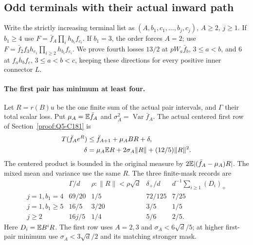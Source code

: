 \subsection{Odd terminals with their actual inward path}
\label{sec:odd-complete:inward-anchor}

Write the strictly increasing terminal list as
$(A,b_1,c_1,\ldots,b_j,c_j)$, $A\ge2$, $j\ge1$.
If $b_1\ge4$ use
$F=\bar f_A\prod_i h_{b_i}f_{c_i}$.
If $b_1=3$, the order forces $A=2$; use
$F=\bar f_2f_3h_{c_1}\prod_{i\ge2}h_{b_i}f_{c_i}$.
We prove fourth losses $13/2$ at $pW_a\bar f_b$, $3\le a<b$,
and $6$ at $f_a h_bf_c$, $3\le a<b<c$, keeping these directions
for every positive inner connector $L$.

\paragraph{The first pair has minimum at least four.}
Let $R=r(B)u$ be the one finite sum of the actual pair intervals,
and $\Gamma$ their total scalar loss. Put
$\mu_A=\mathbb E\bar f_A$ and
$\sigma_A^2=\operatorname{Var}\bar f_A$.
The actual centered first row of Section~\ref{proof:Q5-C181} is
\begin{equation}\label{eq:odd-anchor:general-first}
\begin{aligned}
 T(\bar f_Ae^R)&\le\bar f_{A+1}+\mu_A BR+\delta,\\
 \delta&=\mu_A\mathbb E R+2\sigma_A\|R\|+(12/5)\|R\|^2.
\end{aligned}
\end{equation}
The centered product is bounded in the original measure by
$2\mathbb E| (\bar f_A-\mu_A)R|$. The mixed mean and variance use
the same $R$. The three finite-mask records are
\[
\begin{array}{c|c|c|c|c}
 &\Gamma/d&\rho:\|R\|<\rho\sqrt d&\delta_+/d
                   &d^{-1}\sum_{i\ge1}(D_i)_+\\\hline
 j=1,b_1=4&69/20&1/5&72/125&7/25\\
 j=1,b_1\ge5&16/5&3/20&3/5&1/5\\
 j\ge2&16j/5&1/4&5/6&2/5.
\end{array}
\]
Here $D_i=\mathbb E B^iR$. The first row uses $A=2,3$ and
$\sigma_A<6\sqrt d/5$; at higher first-pair minimum use
$\sigma_A<3\sqrt d/2$ and its matching stronger mask.


